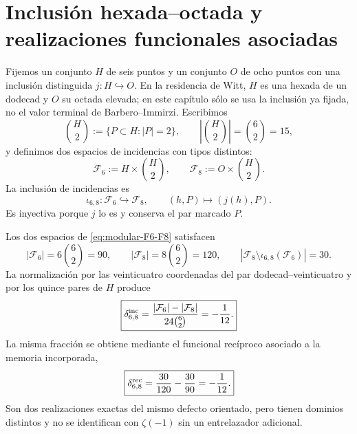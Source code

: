 \label{ch:modular}

\section{Inclusi\'on hexada--octada y realizaciones funcionales asociadas}

Fijemos un conjunto \(H\) de seis puntos y un conjunto \(O\) de ocho
puntos con una inclusi\'on distinguida \(j:H\hookrightarrow O\). En la
residencia de Witt, \(H\) es una hexada de un dodecad y \(O\) su octada
elevada; en este cap\'itulo s\'olo se usa la inclusi\'on ya fijada, no el
valor terminal de Barbero--Immirzi. Escribimos
\begin{equation}
\label{eq:modular-pairs-H}
\binom H2:=\{P\subset H:|P|=2\},
\qquad \left|\binom H2\right|=\binom62=15,
\end{equation}
y definimos dos espacios de incidencias con tipos distintos:
\begin{equation}
\label{eq:modular-F6-F8}
\mathcal F_6:=H\times\binom H2,
\qquad
\mathcal F_8:=O\times\binom H2.
\end{equation}
La inclusi\'on de incidencias es
\begin{equation}
\label{eq:modular-iota68}
\iota_{6,8}:\mathcal F_6\hookrightarrow\mathcal F_8,
\qquad
(h,P)\longmapsto(j(h),P).
\end{equation}
Es inyectiva porque \(j\) lo es y conserva el par marcado \(P\).

\begin{theorem}
\label{thm:modular-incidence-90-120}
Los dos espacios de \cref{eq:modular-F6-F8} satisfacen
\begin{equation}
\label{eq:modular-counts-90-120}
|\mathcal F_6|=6\binom62=90,
\qquad
|\mathcal F_8|=8\binom62=120,
\qquad
|\mathcal F_8\setminus\iota_{6,8}(\mathcal F_6)|=30.
\end{equation}
La normalizaci\'on por las veinticuatro coordenadas del par
dodecad--veinticuatro y por los quince pares de \(H\) produce
\begin{equation}
\label{eq:modular-incidence-defect}
\boxed{
\delta_{6,8}^{\rm inc}
=\frac{|\mathcal F_6|-|\mathcal F_8|}
{24\binom62}=-\frac1{12}.}
\end{equation}
La misma fracci\'on se obtiene mediante el funcional rec\'iproco asociado
a la memoria incorporada,
\begin{equation}
\label{eq:modular-reciprocal-defect}
\boxed{
\delta_{6,8}^{\rm rec}
=\frac{30}{120}-\frac{30}{90}=-\frac1{12}.}
\end{equation}
Son dos realizaciones exactas del mismo defecto orientado, pero tienen
dominios distintos y no se identifican con \(\zeta(-1)\) sin un
entrelazador adicional.
\end{theorem}

